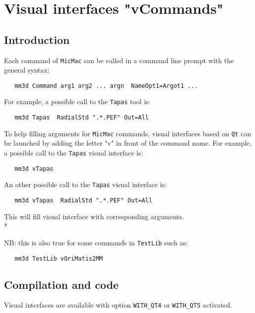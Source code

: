 \section{Visual interfaces "vCommands"}
\subsection{Introduction}

Each command of {\tt MicMac} can be called in a command line prompt with the general syntax:

\begin{verbatim}
   mm3d Command arg1 arg2 ... argn  NameOpt1=Argot1 ...
\end{verbatim}

For example, a possible call to the {\tt Tapas} tool is:

\begin{verbatim}
   mm3d Tapas  RadialStd ".*.PEF" Out=All
\end{verbatim}

To help filling arguments for {\tt MicMac} commands, visual interfaces based on {\tt Qt} can be launched by adding the letter "v" in front of the command name. For example, a possible call to the {\tt Tapas} visual interface is:

\begin{verbatim}
   mm3d vTapas 
\end{verbatim}

An other possible call to the {\tt Tapas} visual interface is:

\begin{verbatim}
   mm3d vTapas  RadialStd ".*.PEF" Out=All
\end{verbatim}

This will fill visual interface with corresponding arguments.\\*

NB: this is also true for some commands in {\tt TestLib} such as:

\begin{verbatim}
   mm3d TestLib vOriMatis2MM
\end{verbatim}

\subsection{Compilation and code}

Visual interfaces are available with option {\tt WITH\_QT4} or {\tt WITH\_QT5} activated.

